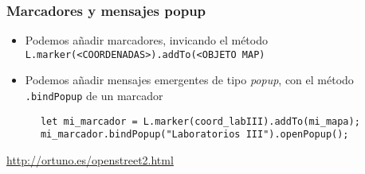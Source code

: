 \documentclass[ucs]{beamer}
\begin{document}
\begin{frame}[fragile]
\frametitle{Marcadores y mensajes popup}
\begin{itemize}
\item
Podemos añadir marcadores, invicando el método
\verb|L.marker(<COORDENADAS>).addTo(<OBJETO MAP)|

\item
Podemos añadir mensajes emergentes de tipo
\emph{popup}, con el método \verb|.bindPopup| de un
marcador
\end{itemize}

  \begin{scriptsize}
  \begin{verbatim}
      let mi_marcador = L.marker(coord_labIII).addTo(mi_mapa);
      mi_marcador.bindPopup("Laboratorios III").openPopup();
  \end{verbatim}
  \end{scriptsize}

\begin{tiny}
\begin{flushright}
\url{http://ortuno.es/openstreet2.html}
\end{flushright}
\end{tiny}
\end{frame}
\end{document}
